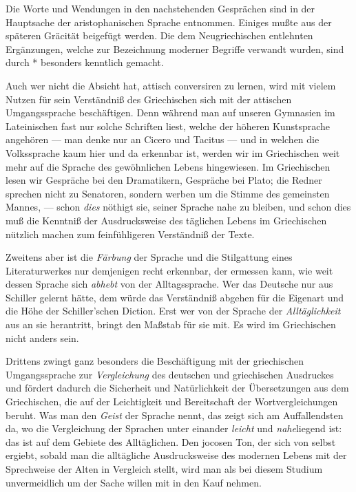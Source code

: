 Die Worte und Wendungen in den nachstehenden Gesprächen sind in der
Hauptsache der aristophanischen Sprache entnommen. Einiges mußte aus
der späteren Gräcität beigefügt werden. Die dem Neugriechischen entlehnten
Ergänzungen, welche zur Bezeichnung moderner Begriffe verwandt wurden,
sind durch {*} besonders kenntlich gemacht.

Auch wer nicht die Absicht hat, attisch conversiren zu lernen, wird
mit vielem Nutzen für sein Verständniß des Griechischen sich mit der
attischen Umgangs\textcompwordmark{}sprache beschäftigen. Denn während
man auf unseren Gymnasien im Lateinischen fast nur solche Schriften
liest, welche der höheren Kunst\textcompwordmark{}sprache angehören
--- man denke nur an Cicero und Tacitus --- und in welchen die Volks\textcompwordmark{}sprache
kaum hier und da er\textcompwordmark{}kennbar ist, werden wir im
Griechischen weit mehr auf die Sprache des gewöhnlichen Lebens hin\textcompwordmark{}gewiesen.
Im Griechischen lesen wir Gespräche bei den Dramatikern, Gespräche
bei Plato; die Redner
sprechen nicht zu Senatoren, sondern werben um die Stimme
des gemeinsten Mannes, --- schon \emph{dies}
nöthigt sie, seiner Sprache nahe zu bleiben, und schon dies muß die
Kenntniß der Aus\textcompwordmark{}drucks\textcompwordmark{}weise
des täglichen Lebens im Griechischen nützlich machen zum feinfühligeren
Verständniß der Texte.

Zweitens aber ist die \emph{Färbung} der Sprache und die Stil\textcompwordmark{}gattung
eines Literatur\textcompwordmark{}werkes nur demjenigen recht erkennbar,
der ermessen kann, wie weit dessen Sprache sich \emph{abhebt} von
der Alltags\textcompwordmark{}sprache. Wer das Deutsche nur aus Schiller
gelernt hätte, dem würde das Verständniß ab\textcompwordmark{}gehen
für die Eigenart und die Höhe der Schiller'schen Diction. Erst wer
von der Sprache der \emph{Alltäglichkeit} aus an sie herantritt,
bringt den Maßstab für sie mit. Es wird im Griechischen nicht anders
sein.

Drittens zwingt ganz besonders die Beschäftigung mit der griechischen
Um\textcompwordmark{}gangs\textcompwordmark{}sprache zur \emph{Vergleichung}
des deutschen und griechischen Aus\textcompwordmark{}druckes und
fördert dadurch die Sicherheit und Natürlichkeit der Über\textcompwordmark{}setzungen
aus dem Griechischen, die auf der Leichtigkeit und Bereit\textcompwordmark{}schaft
der Wort\textcompwordmark{}ver\textcompwordmark{}gleichungen
beruht. Was man den \emph{Geist} der Sprache nennt, das zeigt sich
am Auf\textcompwordmark{}fallendsten da, wo die Vergleichung der
Sprachen unter einander \emph{leicht} und \emph{nahe}liegend ist:
das ist auf dem Gebiete des Alltäglichen. Den jocosen Ton, der sich
von selbst ergiebt, sobald man die alltägliche Aus\textcompwordmark{}drucks\textcompwordmark{}weise
des modernen Lebens mit der Sprechweise der Alten in Vergleich stellt,
wird man als bei diesem Studium unvermeidlich um der Sache willen
mit in den Kauf nehmen.

